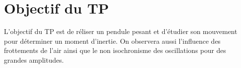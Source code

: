 \documentclass{tp}
\begin{document}

\section{Objectif du TP}
L'objectif du TP est de réliser un pendule pesant et d'étudier son mouvement pour déterminer un moment d'inertie. On observera aussi l'influence des frottements de l'air ainsi que le non isochronisme des oscillations pour des grandes amplitudes.
\end{document}
